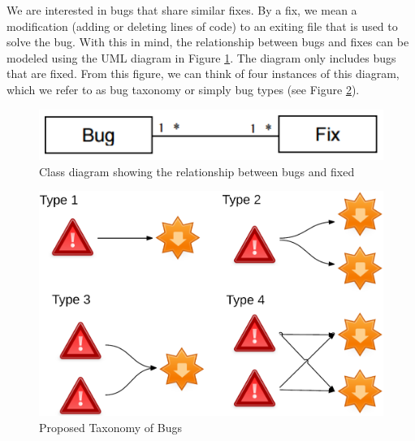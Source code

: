 \documentclass[natbib]{svjour3}
\begin{document}
We are interested in bugs that share similar fixes. By a fix, we mean a
modification (adding or deleting lines of code) to an exiting file that
is used to solve the bug. With this in mind, the relationship between
bugs and fixes can be modeled using the UML diagram in Figure
\ref{fig:bug-taxo-diag}. The diagram only includes bugs that are fixed.
From this figure, we can think of four instances of this diagram, which
we refer to as bug taxonomy or simply bug types (see Figure
\ref{fig:bug-taxo}).

\begin{figure}[h!]
  \centering
    \includegraphics[scale=0.5]{media/bug-taxo-class-diag.png}
    \caption{Class diagram showing the relationship between bugs and fixed
    \label{fig:bug-taxo-diag}}
\end{figure}

\begin{figure}[h!]
  \centering
    \includegraphics[scale=0.6]{media/bug-taxo.png}
    \caption{Proposed Taxonomy of Bugs
    \label{fig:bug-taxo}}
\end{figure}
\end{document}
